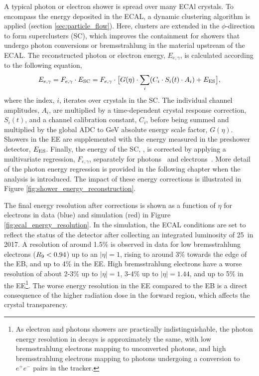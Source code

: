 A typical photon or electron shower is spread over many ECAl crystals. To encompass the energy deposited in the ECAL, a dynamic clustering algorithm is applied (section \ref{sec:particle_flow}). Here, clusters are extended in the $\phi$-direction to form superclusters (SC), which improves the containment for showers that undergo photon conversions or bremsstrahlung in the material upstream of the ECAL. The reconstructed photon or electron energy, $E_{e,\gamma}$, is calculated according to the following equation,
\begin{equation}
    E_{e,\gamma} = F_{e,\gamma} \cdot E_{\rm{SC}} = F_{e,\gamma} \cdot \big[ G(\eta) \cdot \sum_i (C_i \cdot S_i(t) \cdot A_i) + E_{\rm{ES}} \big],
\end{equation}
\noindent
where the index, $i$, iterates over crystals in the SC. The individual channel amplitudes, $A_i$, are multiplied by a time-dependent crystal response correction, $S_i(t)$, and a channel calibration constant, $C_i$, before being summed and multiplied by the global ADC to GeV absolute energy scale factor, $G(\eta)$. Showers in the EE are supplemented with the energy measured in the preshower detector, $E_{\rm{ES}}$. Finally, the energy of the SC, \Eraw, is corrected by applying a multivariate regression, $F_{e,\gamma}$, separately for photons~\cite{Khachatryan:2015iwa} and electrons~\cite{Khachatryan:2015hwa}. More detail of the photon energy regression is provided in the following chapter when the \Hgg analysis is introduced. The impact of these energy corrections is illustrated in Figure \ref{fig:shower_energy_reconstruction}.

The final energy resolution after corrections is shown as a function of $\eta$ for \Zee electrons in data (blue) and simulation (red) in Figure \ref{fig:ecal_energy_resolution}. In the simulation, the ECAL conditions are set to reflect the status of the detector after collecting an integrated luminosity of 25~\fbinv in 2017. A resolution of around 1.5\% is observed in data for low bremsstrahlung electrons ($R_9<0.94$) up to an $|\eta|=1$, rising to around 3\% towards the edge of the EB, and up to 4\% in the EE. High bremsstrahlung electrons have a worse resolution of about 2-3\% up to $|\eta|=1$, 3-4\% up to $|\eta|=1.44$, and up to 5\% in the EE\footnote{As electron and photons showers are practically indistinguishable, the photon energy resolution in \Hgg decays is approximately the same, with low bremsstrahlung electrons mapping to unconverted photons, and high bremsstrahlung electrons mapping to photons undergoing a conversion to $e^+e^-$ pairs in the tracker.}. The worse energy resolution in the EE compared to the EB is a direct consequence of the higher radiation dose in the forward region, which affects the crystal transparency.

